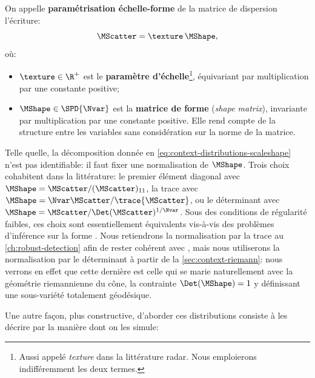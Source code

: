 \begin{definition}
\label{def:context-distributions-scaleshape}
  On appelle \textbf{paramétrisation échelle-forme} de la matrice de dispersion l'écriture:
\begin{equation}
  \MScatter = \texture\,\MShape,
  \label{eq:context-distributions-scaleshape}
\end{equation}
  où:
  \begin{itemize}
    \item $\texture\in\R^+$ est le \textbf{paramètre d'échelle}\footnote{Aussi appelé \textit{texture} dans la littérature radar. Nous emploierons indifféremment les deux termes.}, équivariant par multiplication par une constante positive;
    \item $\MShape\in\SPD{\Nvar}$ est la \textbf{matrice de forme} (\textit{shape matrix}), invariante par multiplication par une constante positive. Elle rend compte de la structure entre les variables sans considération sur la norme de la matrice.
  \end{itemize}
\end{definition}

\begin{remark}
  Telle quelle, la décomposition donnée en \cref{eq:context-distributions-scaleshape} n'est pas identifiable: il faut fixer une normalisation de $\MShape$. Trois choix cohabitent dans la littérature: le premier élément diagonal  avec $\MShape = \MScatter/(\MScatter)_{11}$, la trace  avec $\MShape = \Nvar\MScatter/\trace{\MScatter}$, ou le déterminant  avec $\MShape = \MScatter/\Det(\MScatter)^{1/\Nvar}$. Sous des conditions de régularité faibles, ces choix sont essentiellement équivalents vis-à-vis des problèmes d'inférence sur la forme . Nous retiendrons la normalisation par la trace au \cref{ch:robust-detection} afin de rester cohérent avec \cite{6263313}, mais nous utiliserons la normalisation par le déterminant à partir de la \cref{sec:context-riemann}: nous verrons en effet que cette dernière est celle qui se marie naturellement avec la géométrie riemannienne du cône, la contrainte $\Det(\MShape)=1$ y définissant une sous-variété totalement géodésique.
\end{remark}

Une autre façon, plus constructive, d'aborder ces distributions consiste à les décrire par la manière dont on les simule:

